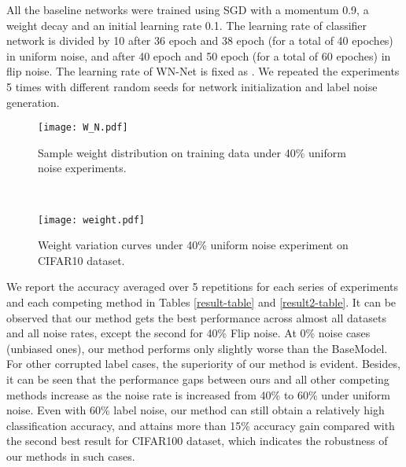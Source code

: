 \documentclass{article}
\begin{document}
	
	All the baseline networks were trained using SGD with a momentum 0.9, a weight decay  and an initial learning rate 0.1. The learning rate of classifier network is divided by 10 after 36 epoch and 38 epoch (for a total of 40 epoches) in uniform noise, and after 40 epoch and 50 epoch (for a total of 60 epoches) in flip noise. The learning rate of WN-Net is fixed as . We repeated the experiments 5 times with different random seeds for network initialization and label noise generation.
	
	\begin{figure}[t] \vspace{0mm}
		\begin{minipage}{0.48\textwidth}
\texttt{[image: W\_N.pdf]} \vspace{-3mm}
\caption{Sample weight distribution on training data under 40\% uniform noise experiments.}
			\label{weightsdis}
		\end{minipage} \ \ \ \ \ \ \ \ \
		\begin{minipage}{0.48\textwidth}
			\centering
\texttt{[image: weight.pdf]} \vspace{-2.4mm}
			\caption{Weight variation curves under 40\% uniform noise experiment on CIFAR10 dataset. } \label{curve}
		\end{minipage}\vspace{0mm}
	\end{figure}
	
	


	We report the accuracy averaged over 5 repetitions for each series of experiments and each competing method in Tables \ref{result-table} and \ref{result2-table}. It can be observed that our method gets the best performance across almost all datasets and all noise rates, except the second for 40\% Flip noise. At 0\% noise cases (unbiased ones), our method performs only slightly worse than the BaseModel. For other corrupted label cases, the superiority of our method is evident.
	Besides, it can be seen that the performance gaps between ours and all other competing methods increase as the noise rate is increased from 40\% to 60\% under uniform noise. Even with 60\% label noise, our method can still obtain a relatively high classification accuracy, and attains more than 15\% accuracy gain compared with the second best result for CIFAR100 dataset, which indicates the robustness of our methods in such cases.
	
	
	
	
	
\end{document}
